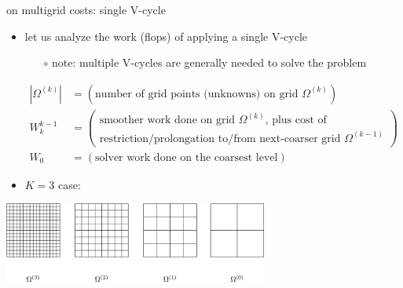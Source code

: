 \documentclass[10pt,
               svgnames,
               hyperref={colorlinks,citecolor=DeepPink4,linkcolor=FireBrick,urlcolor=Maroon},
               usepdftitle=false]{beamer}
\begin{document}
\begin{frame}{on multigrid costs: single V-cycle}
\begin{itemize}
\item let us analyze the work (flops) of applying a single V-cycle
    \begin{itemize}
    \item[$\circ$] note: multiple V-cycles are generally needed to solve the problem
    \end{itemize}

\medskip
\begin{definitions}

\vspace{-4mm}
\begin{align*}
|\Omega^{(k)}| &= (\text{number of grid points (unknowns) on grid $\Omega^{(k)}$}) \\
W_k^{k-1} &= \left(\begin{matrix} \text{smoother work done on grid $\Omega^{(k)}$, plus cost of} \\ \text{restriction/prolongation to/from next-coarser grid $\Omega^{(k-1)}$} \end{matrix}\right) \\
W_0 &= (\text{solver work done on the coarsest level})
\end{align*}
\end{definitions}

\medskip
\item $K=3$ case:
\end{itemize}

\vspace{-3mm}
\hfill \includegraphics[width=0.65\textwidth]{images/multigrid-grids.png}
\end{frame}
\end{document}
